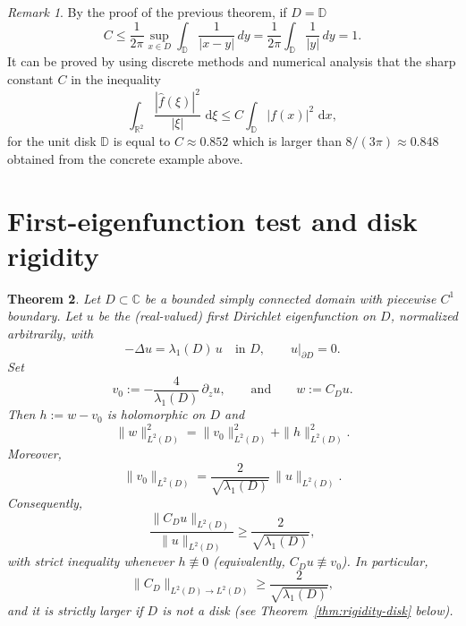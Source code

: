 \documentclass{amsart}
\newcommand{\R}{\mathbb{R}}
\newcommand{\C}{\mathbb{C}}
\newcommand{\dd}{\,\mathrm{d}}
\newcommand{\abs}[1]{\left|#1\right|}
\theoremstyle{plain}
\newtheorem{theorem}{Theorem}
\theoremstyle{remark}
\newtheorem{remark}[theorem]{Remark}
\begin{document}
\begin{remark} By the proof of the previous theorem, if $D=\mathbb{D}$ \[C\le \frac{1}{2\pi}\sup_{x\in D}\int_{\mathbb{D}}\frac{1}{|x-y|}\,dy=\frac{1}{2\pi}\int_{\mathbb{D}}\frac{1}{|y|}\,dy=1.
\]
It can be proved by using discrete methods and numerical analysis that the sharp constant $C$ in the inequality \[
\int_{\R^2}\frac{\abs{\widehat f(\xi)}^2}{|\xi|}\,\dd\xi
\le C\int_{\mathbb{D}} \abs{f(x)}^2\,\dd x,
\] for the unit disk $\mathbb{D}$ is equal to $C\approx 0.852$ which is larger than $8/(3\pi)\approx 0.848$ obtained from the concrete example above.
\end{remark}
\section{First-eigenfunction test and disk rigidity}\label{five}
\begin{theorem}\label{thm:strict-eigtest}
Let $D\subset\C$ be a bounded simply connected domain with piecewise $C^1$ boundary.
Let $u$ be the (real-valued) first Dirichlet eigenfunction on $D$, normalized arbitrarily, with
\[
-\Delta u=\lambda_1(D)\,u \quad \text{in }D,\qquad u|_{\partial D}=0.
\]
Set
\[
v_0:=-\frac{4}{\lambda_1(D)}\,\partial_z u,
\qquad\text{and}\qquad
w:=C_D u.
\]
Then $h:=w-v_0$ is holomorphic on $D$ and
\begin{equation}\label{eq:pythagoras}
\|w\|_{L^2(D)}^2=\|v_0\|_{L^2(D)}^2+\|h\|_{L^2(D)}^2.
\end{equation}
Moreover,
\begin{equation}\label{eq:v0-threshold}
\|v_0\|_{L^2(D)}=\frac{2}{\sqrt{\lambda_1(D)}}\,\|u\|_{L^2(D)}.
\end{equation}
Consequently,
\[
\frac{\|C_D u\|_{L^2(D)}}{\|u\|_{L^2(D)}}\ge \frac{2}{\sqrt{\lambda_1(D)}},
\]
with strict inequality whenever $h\not\equiv 0$ (equivalently, $C_Du\not\equiv v_0$). In particular,
\[
\|C_D\|_{L^2(D)\to L^2(D)}\ge \frac{2}{\sqrt{\lambda_1(D)}},
\]
and it is strictly larger if $D$ is not a disk (see Theorem~\ref{thm:rigidity-disk} below).
\end{theorem}
\end{document}
